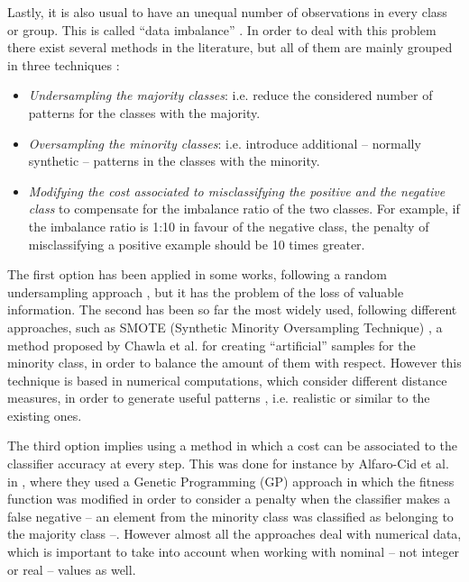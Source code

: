 Lastly, it is also usual to have an unequal number of observations in every class or group. This is called ``data imbalance'' \cite{imbalanced_data_05}. In order to deal with this problem there exist several methods in the literature, but all of them are mainly grouped in three techniques \cite{imbalance_techniques_02}: 

\begin{itemize}
\item \textit{Undersampling the majority classes}: i.e. reduce the considered number of patterns for the classes with the majority.
\item \textit{Oversampling the minority classes}: i.e. introduce additional -- normally synthetic -- patterns in the classes with the minority.
\item \textit{Modifying the cost associated to misclassifying the positive and the negative class} to compensate for the imbalance ratio of the two classes. For example, if the imbalance ratio is 1:10 in favour of the negative class, the penalty of misclassifying a positive example should be 10 times greater.
\end{itemize}

The first option has been applied in some works, following a random undersampling approach \cite{random_undersampling_08}, but it has the problem of the loss of valuable information. The second has been so far the most widely used, following different approaches, such as SMOTE (Synthetic Minority Oversampling Technique) \cite{smote_02}, a method proposed by Chawla et al. for creating ``artificial'' samples for the minority class, in order to balance the amount of them with respect. However this technique is based in numerical computations, which consider different distance measures, in order to generate useful patterns , i.e. realistic or similar to the existing ones.

The third option implies using a method in which a cost can be associated to the classifier accuracy at every step. This was done for instance by Alfaro-Cid et al. in \cite{cost_adjustment_07}, where they used a Genetic Programming (GP) approach in which the fitness function was modified in order to consider a penalty when the classifier makes a false negative -- an element from the minority class was classified as belonging to the majority class --. However almost all the approaches deal with numerical data, which is important to take into account when working with nominal -- not integer or real -- values as well.

